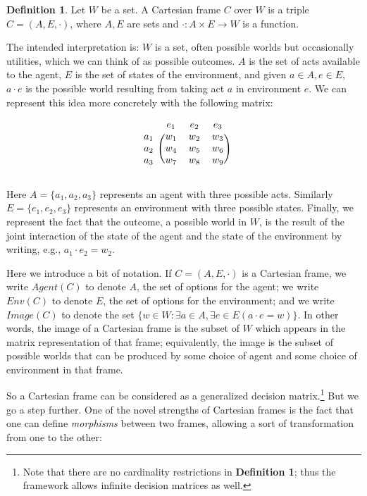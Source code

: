 \documentclass{article}
\begin{document}
\bigskip
\noindent \textbf{Definition 1}.
Let $W$ be a set.
A Cartesian frame $C$ over $W$ is a triple $C = (A, E, \cdot)$, where $A, E$ are sets and $\cdot : A \times E \to W$ is a function.

\bigskip
\noindent The intended interpretation is: $W$ is a set, often possible worlds but occasionally utilities, which we can think of as possible outcomes. $A$ is the set of acts available to the agent, $E$ is the set of states of the environment, and given $a \in A, e \in E$, $a \cdot e$ is the possible world resulting from taking act $a$ in environment $e$.  
We can represent this idea more concretely with the following matrix:

\bigskip
\[
\begin{blockarray}{cccc}
& e_1 & e_2 & e_3\\
\begin{block}{c(ccc)}
a_1 & w_1 & w_2 & w_3\\
a_2 & w_4 & w_5 & w_6\\
a_3 & w_7 & w_8 & w_9\\
\end{block}
\end{blockarray}
\]

\bigskip
\noindent Here $A = \{ a_1, a_2, a_3\}$ represents an agent with three possible acts.
Similarly $E = \{e_1, e_2, e_3\}$ represents an environment with three possible states.
Finally, we represent the fact that the outcome, a possible world in $W$, is the result of the joint interaction of the state of the agent and the state of the environment by writing, e.g., $a_1 \cdot e_2 = w_2$.

Here we introduce a bit of notation.
If $C = (A, E, \cdot)$ is a Cartesian frame, we write $Agent(C)$ to denote $A$, the set of options for the agent;
we write $Env(C)$ to denote $E$, the set of options for the environment;
and we write $Image(C)$ to denote the set $\{w \in W : \exists a \in A, \exists e \in E (a \cdot e = w) \}$.
In other words, the image of a Cartesian frame is the subset of $W$ which appears in the matrix representation of that frame;
equivalently, the image is the subset of possible worlds that can be produced by some choice of agent and some choice of environment in that frame.

So a Cartesian frame can be considered as a generalized decision matrix.\footnote{Note that there are no cardinality restrictions in \textbf{Definition 1}; thus the framework allows infinite decision matrices as well.}
But we go a step further.
One of the novel strengths of Cartesian frames is the fact that one can define \emph{morphisms} between two frames, allowing a sort of transformation from one to the other:
\end{document}
